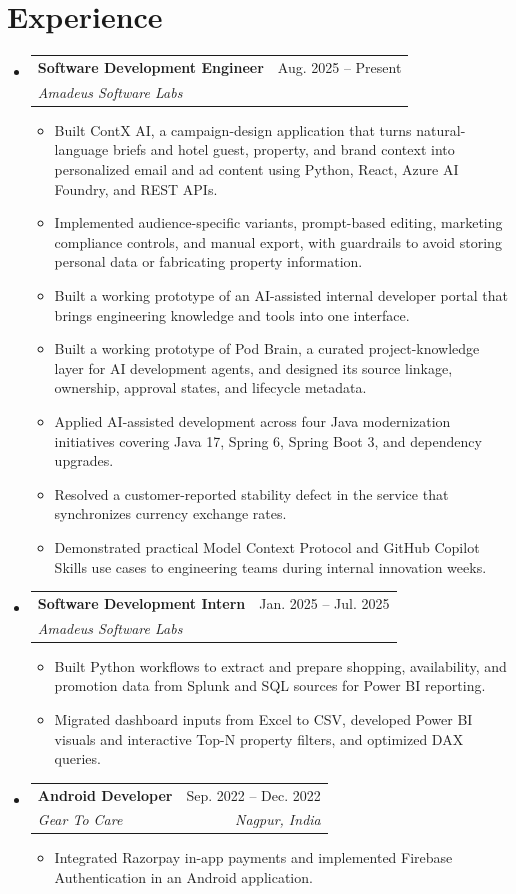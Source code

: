 \documentclass[a4paper,11pt]{article}
\makeatletter
\newcommand{\entry}[4]{\item\begin{tabularx}{\textwidth}{@{}Xr@{}}\textbf{#1}& #2\\\textit{\small #3}&\textit{\small #4}\end{tabularx}\vspace{-5pt}}
\newcommand{\bulletpoint}[1]{\item\small{#1}}
\makeatother
\begin{document}
\section{Experience}
\begin{itemize}[leftmargin=0in,label={}]
  \entry{Software Development Engineer}{Aug. 2025 -- Present}{Amadeus Software Labs}{}
  \begin{itemize}
    \bulletpoint{Built ContX AI, a campaign-design application that turns natural-language briefs and hotel guest, property, and brand context into personalized email and ad content using Python, React, Azure AI Foundry, and REST APIs.}
    \bulletpoint{Implemented audience-specif{}ic variants, prompt-based editing, marketing compliance controls, and manual export, with guardrails to avoid storing personal data or fabricating property information.}
    \bulletpoint{Built a working prototype of an AI-assisted internal developer portal that brings engineering knowledge and tools into one interface.}
    \bulletpoint{Built a working prototype of Pod Brain, a curated project-knowledge layer for AI development agents, and designed its source linkage, ownership, approval states, and lifecycle metadata.}
    \bulletpoint{Applied AI-assisted development across four Java modernization initiatives covering Java 17, Spring 6, Spring Boot 3, and dependency upgrades.}
    \bulletpoint{Resolved a customer-reported stability defect in the service that synchronizes currency exchange rates.}
    \bulletpoint{Demonstrated practical Model Context Protocol and GitHub Copilot Skills use cases to engineering teams during internal innovation weeks.}
  \end{itemize}
  \entry{Software Development Intern}{Jan. 2025 -- Jul. 2025}{Amadeus Software Labs}{}
  \begin{itemize}
    \bulletpoint{Built Python workf{}lows to extract and prepare shopping, availability, and promotion data from Splunk and SQL sources for Power BI reporting.}
    \bulletpoint{Migrated dashboard inputs from Excel to CSV, developed Power BI visuals and interactive Top-N property f{}ilters, and optimized DAX queries.}
  \end{itemize}
  \entry{Android Developer}{Sep. 2022 -- Dec. 2022}{Gear To Care}{Nagpur, India}
  \begin{itemize}
    \bulletpoint{Integrated Razorpay in-app payments and implemented Firebase Authentication in an Android application.}
  \end{itemize}
\end{itemize}
\end{document}
